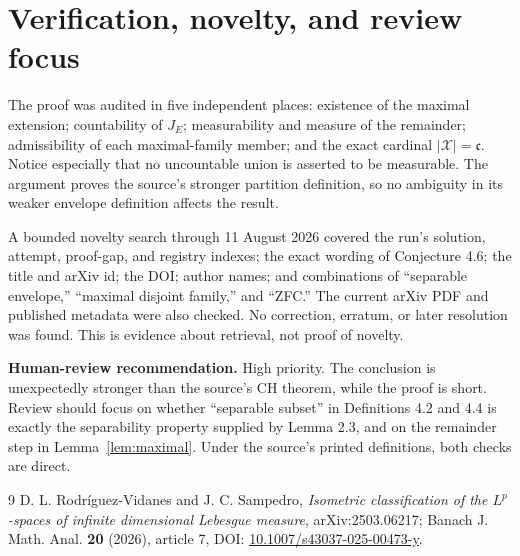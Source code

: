 \documentclass[11pt]{article}
\newcommand{\cX}{\mathcal X}
\newcommand{\fc}{\mathfrak c}
\begin{document}
\section{Verification, novelty, and review focus}

The proof was audited in five independent places: existence of the maximal
extension; countability of $J_E$; measurability and measure of the remainder;
admissibility of each maximal-family member; and the exact cardinal
$|\cX|=\fc$.  Notice especially that no uncountable union is asserted to be
measurable.  The argument proves the source's stronger partition definition,
so no ambiguity in its weaker envelope definition affects the result.

A bounded novelty search through 11 August 2026 covered the run's solution,
attempt, proof-gap, and registry indexes; the exact wording of Conjecture 4.6;
the title and arXiv id; the DOI; author names; and combinations of
``separable envelope,'' ``maximal disjoint family,'' and ``ZFC.''  The current
arXiv PDF and published metadata were also checked.  No correction, erratum,
or later resolution was found.  This is evidence about retrieval, not proof
of novelty.

\medskip
\noindent\textbf{Human-review recommendation.} High priority.  The conclusion
is unexpectedly stronger than the source's CH theorem, while the proof is
short.  Review should focus on whether ``separable subset'' in Definitions
4.2 and 4.4 is exactly the separability property supplied by Lemma 2.3, and
on the remainder step in Lemma~\ref{lem:maximal}.  Under the source's printed
definitions, both checks are direct.

\begin{thebibliography}{9}
D. L. Rodríguez-Vidanes and J. C. Sampedro,
\emph{Isometric classification of the $L^p$-spaces of infinite dimensional
Lebesgue measure}, arXiv:2503.06217; Banach J. Math. Anal. \textbf{20}
(2026), article 7, DOI: \href{https://doi.org/10.1007/s43037-025-00473-y}
{10.1007/s43037-025-00473-y}.
\end{thebibliography}
\end{document}
